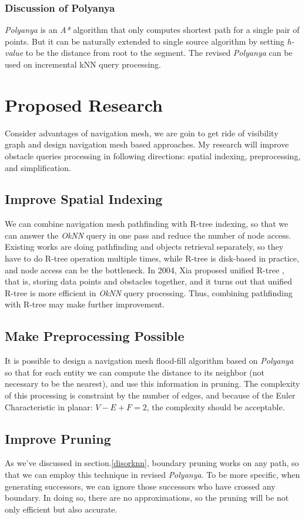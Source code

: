 \subsubsection{Discussion of Polyanya}
\textit{Polyanya} is an \textit{A*} algorithm that only computes shortest path for a single pair
of points. But it can be naturally extended to single source algorithm by setting
\textit{h-value} to be the distance from root to the segment. The revised \textit{Polyanya} can be
used on incremental kNN query processing.

\section{Proposed Research}
Consider advantages of navigation mesh, we are goin to get ride of visibility graph and design navigation mesh based approaches.
My research will improve obstacle queries processing in following directions: spatial indexing,
preprocessing, and simplification.

\subsection{Improve Spatial Indexing}
We can combine navigation mesh pathfinding with R-tree indexing, so that we can answer the
\textit{OkNN} query in one pass and reduce the number of node access.
Existing works are doing pathfinding and objects retrieval separately, so they have to do
R-tree operation multiple times, while R-tree is disk-based in practice, and node access can be
the bottleneck. In 2004, Xia proposed unified R-tree \cite{xia2004fast}, that is, storing data
points and obstacles together, and it turns out that unified R-tree is more efficient in
\textit{OkNN} query processing. Thus, combining pathfinding with R-tree may make further
improvement.

\subsection{Make Preprocessing Possible}
It is possible to design a navigation mesh flood-fill algorithm based on \textit{Polyanya} so
that for each entity we can compute the distance to its neighbor (not necessary to be the
nearest), and use this information in pruning. The complexity of this processing is constraint
by the number of edges, and because of the Euler Characteristic in planar: $V-E+F=2$, the
complexity should be acceptable.

\subsection{Improve Pruning}
As we've discussed in section.\ref{disorknn}, boundary pruning works on any path, so that we can
employ this technique in revised \textit{Polyanya}. To be more specific, when generating
successors, we can ignore those successors who have crossed any boundary. In doing so, there
are no approximations, so the pruning will be not only efficient but also accurate.

